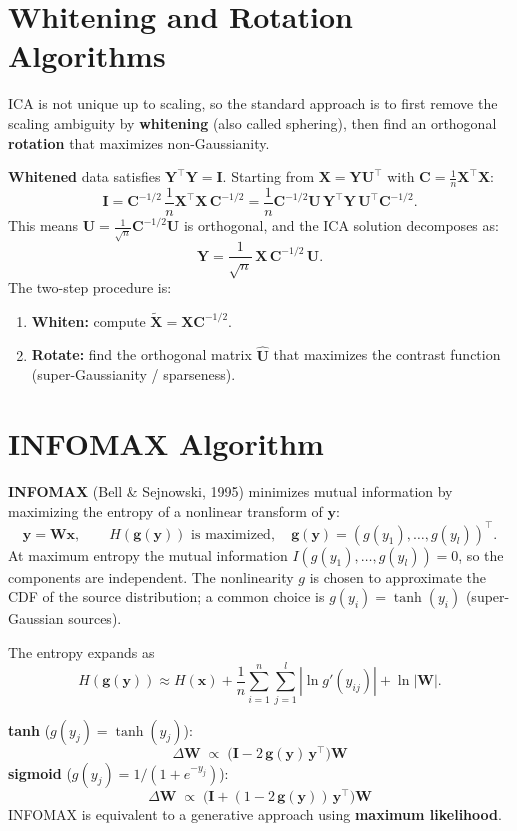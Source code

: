\documentclass[11pt, oneside]{book}
\newcommand{\T}{^{\top}}
\begin{document}
\section{Whitening and Rotation Algorithms}

ICA is not unique up to scaling, so the standard approach is to first remove the
scaling ambiguity by \textbf{whitening} (also called sphering), then find an
orthogonal \textbf{rotation} that maximizes non-Gaussianity.

\textbf{Whitened} data satisfies $\bm{Y}\T\bm{Y} = \bm{I}$.
Starting from $\bm{X} = \bm{Y}\bm{U}\T$ with $\bm{C} = \frac{1}{n}\bm{X}\T\bm{X}$:
\[
  \bm{I} = \bm{C}^{-1/2}\,\frac{1}{n}\bm{X}\T\bm{X}\,\bm{C}^{-1/2}
  = \frac{1}{n}\bm{C}^{-1/2}\bm{U}\,\bm{Y}\T\bm{Y}\,\bm{U}\T\bm{C}^{-1/2}.
\]
This means $\hat{\bm{U}} = \frac{1}{\sqrt{n}}\bm{C}^{-1/2}\bm{U}$ is orthogonal, and
the ICA solution decomposes as:
\[
  \bm{Y} = \frac{1}{\sqrt{n}}\,\bm{X}\,\bm{C}^{-1/2}\,\hat{\bm{U}}.
\]
The two-step procedure is:
\begin{enumerate}
  \item \textbf{Whiten:} compute $\tilde{\bm{X}} = \bm{X}\bm{C}^{-1/2}$.
  \item \textbf{Rotate:} find the orthogonal matrix $\hat{\bm{U}}$ that maximizes
        the contrast function (super-Gaussianity / sparseness).
\end{enumerate}


\section{INFOMAX Algorithm}

\textbf{INFOMAX} (Bell \& Sejnowski, 1995) minimizes mutual information by maximizing
the entropy of a nonlinear transform of $\bm{y}$:
\[
  \bm{y} = \bm{W}\bm{x}, \qquad
  H(\bm{g}(\bm{y})) \text{ is maximized},
  \quad \bm{g}(\bm{y}) = (g(y_1),\ldots,g(y_l))\T.
\]
At maximum entropy the mutual information $I(g(y_1),\ldots,g(y_l)) = 0$, so the
components are independent.
The nonlinearity $g$ is chosen to approximate the CDF of the source distribution;
a common choice is $g(y_i) = \tanh(y_i)$ (super-Gaussian sources).

The entropy expands as
\[
  H(\bm{g}(\bm{y})) \approx H(\bm{x}) + \frac{1}{n}\sum_{i=1}^n\sum_{j=1}^l
  |\ln g'(y_{ij})| + \ln|\bm{W}|.
\]

\begin{thmbox}[title={INFOMAX Update Rules (Natural Gradient)}]
\textbf{tanh} ($g(y_j) = \tanh(y_j)$):
\[
  \Delta\bm{W} \;\propto\; \bigl(\bm{I} - 2\,\bm{g}(\bm{y})\,\bm{y}\T\bigr)\bm{W}
\]
\textbf{sigmoid} ($g(y_j) = 1/(1+e^{-y_j})$):
\[
  \Delta\bm{W} \;\propto\; \bigl(\bm{I} + (1 - 2\,\bm{g}(\bm{y}))\,\bm{y}\T\bigr)\bm{W}
\]
INFOMAX is equivalent to a generative approach using \textbf{maximum likelihood}.
\end{thmbox}
\end{document}
